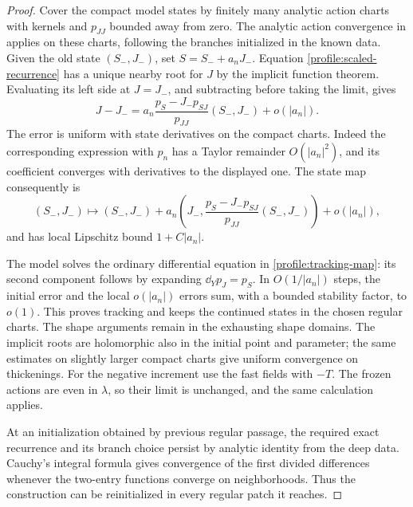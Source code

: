 \begin{proof}
Cover the compact model states by finitely many analytic action
charts with kernels and \(p_{JJ}\) bounded away from zero. The
analytic action convergence in
 applies on these charts,
following the branches initialized in the known data. Given the old
state \((S_-,J_-)\), set \(S=S_-+a_nJ_-\). Equation
\eqref{profile:scaled-recurrence} has a unique nearby root for \(J\)
by the implicit function theorem. Evaluating its left side at
\(J=J_-\), and subtracting before taking the limit, gives
\[
 J-J_-=a_n\frac{p_S-J_-p_{SJ}}{p_{JJ}}(S_-,J_-)+o(|a_n|).
\]
The error is uniform with state derivatives on the compact charts.
Indeed the corresponding expression with \(p_n\) has a Taylor
remainder \(O(|a_n|^2)\), and its coefficient converges with
derivatives to the displayed one. The state map consequently is
\begin{equation}
 \label{profile:tracking-map}
 (S_-,J_-)\longmapsto(S_-,J_-)
 +a_n\left(J_-,\frac{p_S-J_-p_{SJ}}{p_{JJ}}(S_-,J_-)\right)
 +o(|a_n|),
\end{equation}
and has local Lipschitz bound \(1+C|a_n|\).

The model solves the ordinary differential equation in
\eqref{profile:tracking-map}: its second component follows by
expanding \(\dd_Yp_J=p_S\). In \(O(1/|a_n|)\) steps, the initial
error and the local \(o(|a_n|)\) errors sum, with a bounded stability
factor, to \(o(1)\). This proves tracking and keeps the continued
states in the chosen regular charts. The shape arguments remain in
the exhausting shape domains. The implicit roots are holomorphic
also in the initial point and parameter; the same estimates on
slightly larger compact charts give uniform convergence on
thickenings. For the negative increment use the fast fields with
\(-T\). The frozen actions are even in \(\lambda\), so their limit
is unchanged, and the same calculation applies.

At an initialization obtained by previous regular passage, the
required exact recurrence and its branch choice persist by analytic
identity from the deep data. Cauchy's integral formula gives
convergence of the first divided differences whenever the two-entry
functions converge on neighborhoods. Thus the construction can be
reinitialized in every regular patch it reaches.
\end{proof}

